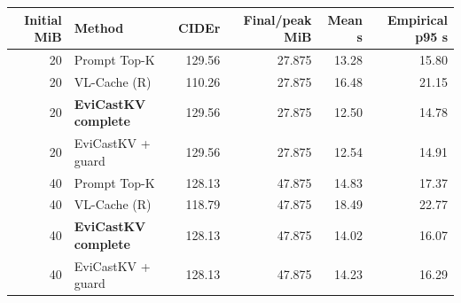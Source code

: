 \begin{tabular}{rlrrrr}
\toprule
Initial MiB & Method & CIDEr & Final/peak MiB & Mean s & Empirical p95 s\\\midrule
20 & Prompt Top-K & 129.56 & 27.875 & 13.28 & 15.80\\
20 & VL-Cache (R) & 110.26 & 27.875 & 16.48 & 21.15\\
20 & \textbf{EviCastKV complete} & 129.56 & 27.875 & 12.50 & 14.78\\
20 & EviCastKV + guard & 129.56 & 27.875 & 12.54 & 14.91\\
40 & Prompt Top-K & 128.13 & 47.875 & 14.83 & 17.37\\
40 & VL-Cache (R) & 118.79 & 47.875 & 18.49 & 22.77\\
40 & \textbf{EviCastKV complete} & 128.13 & 47.875 & 14.02 & 16.07\\
40 & EviCastKV + guard & 128.13 & 47.875 & 14.23 & 16.29\\
\bottomrule
\end{tabular}

